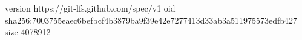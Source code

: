 version https://git-lfs.github.com/spec/v1
oid sha256:7003755eaec6befbcf4b3879ba9f39e42e7277413d33ab3a511975573edfb427
size 4078912
